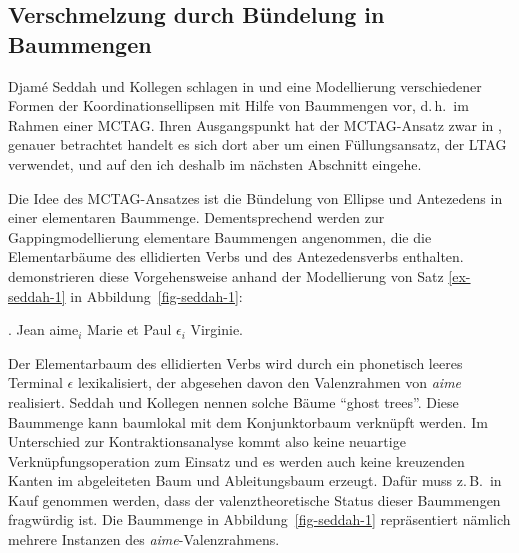 \subsection{Verschmelzung durch Bündelung in Baummengen}

Djam\'e Seddah und Kollegen schlagen in \cite{Seddah:08} und \cite{Seddah:etal:10} eine Modellierung verschiedener Formen der Koordinationsellipsen mit Hilfe von Baummengen vor, d.\,h.\ im Rahmen einer MCTAG. Ihren Ausgangspunkt hat der MCTAG-Ansatz zwar in \cite{Seddah:Sagot:06}, genauer betrachtet handelt es sich dort aber um einen Füllungsansatz, der LTAG verwendet, und auf den ich deshalb im nächsten Abschnitt eingehe.

Die Idee des MCTAG-Ansatzes ist die Bündelung von Ellipse und Antezedens in einer elementaren Baummenge. Dementsprechend werden zur Gappingmodellierung elementare Baummengen angenommen, die die Elementarbäume des ellidierten Verbs und des Antezedensverbs enthalten. \cite{Seddah:etal:10} demonstrieren diese Vorgehensweise anhand der Modellierung von Satz \ref{ex-seddah-1} in Abbildung~\ref{fig-seddah-1}:

\ex. \label{ex-seddah-1} Jean aime$_i$ Marie et Paul $\epsilon_i$ Virginie. \hfill \cite[(1)]{Seddah:etal:10}

Der Elementarbaum des ellidierten Verbs wird durch ein phonetisch leeres Terminal $\epsilon$ lexikalisiert, der abgesehen davon den Valenzrahmen von {\it aime} realisiert. Seddah und Kollegen nennen solche Bäume "`ghost trees"'. Diese Baummenge kann baumlokal mit dem Konjunktorbaum verknüpft werden. Im Unterschied zur Kontraktionsanalyse kommt also keine neuartige Verknüpfungsoperation zum Einsatz und es werden auch keine kreuzenden Kanten im abgeleiteten Baum und Ableitungsbaum erzeugt. Dafür muss z.\,B.\ in Kauf genommen werden, dass der valenztheoretische Status dieser Baummengen fragwürdig ist. Die Baummenge in Abbildung~\ref{fig-seddah-1} repräsentiert nämlich mehrere Instanzen des {\it aime}-Valenzrahmens. 

